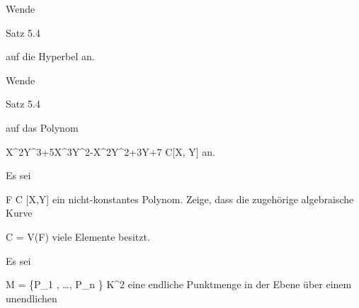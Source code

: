 {}
{





Wende
 {} {}

Satz 5.4

auf die Hyperbel
 an.





}
{} {}

{}
{





Wende
 {} {}

Satz 5.4

auf das Polynom

\mavergleichskette
{\vergleichskette
{ X^2Y^3+5X^3Y^2-X^2Y^2+3Y+7
}
{ \in }{  {\mathbb C}[X, Y]
}
{  }{
}
{    }{
}
{   }{
}
}
{}{}{}
an.





}
{} {}

{}
{





Es sei

\mavergleichskette
{\vergleichskette
{ F
}
{ \in }{ {\mathbb C} [X,Y]
}
{  }{
}
{    }{
}
{   }{
}
}
{}{}{}
ein nicht-konstantes Polynom. Zeige, dass die zugehörige algebraische Kurve

\mavergleichskette
{\vergleichskette
{ C
}
{ = }{ V(F)
}
{  }{
}
{    }{
}
{   }{
}
}
{}{}{}
viele Elemente besitzt.





}
{} {}

{}
{





Es sei

\mavergleichskette
{\vergleichskette
{M
}
{ = }{ \{P_1 , \ldots , P_n \}
}
{ \subseteq }{ K^2
}
{    }{
}
{   }{
}
}
{}{}{}
eine endliche Punktmenge in der Ebene über einem unendlichen





}
{} {}

